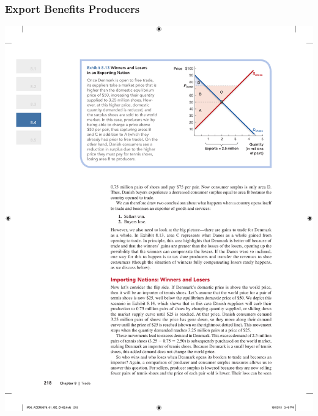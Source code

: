 \documentclass[12pt, xcolor=dvipsnames]{beamer}
\begin{document}
\begin{frame}
\frametitle{\bf Export Benefits Producers}
\begin{center}
\includegraphics[height=.85\textheight]{figures/2.pdf}
\end{center}
\end{frame}
\end{document}
